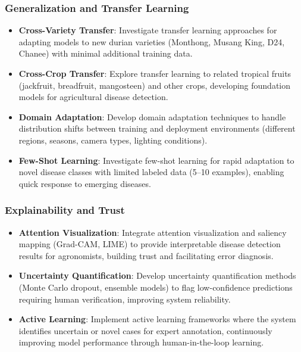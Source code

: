 \subsubsection{Generalization and Transfer Learning}

\begin{itemize}
\item \textbf{Cross-Variety Transfer}: Investigate transfer learning approaches for adapting models to new durian varieties (Monthong, Musang King, D24, Chanee) with minimal additional training data.

\item \textbf{Cross-Crop Transfer}: Explore transfer learning to related tropical fruits (jackfruit, breadfruit, mangosteen) and other crops, developing foundation models for agricultural disease detection.

\item \textbf{Domain Adaptation}: Develop domain adaptation techniques to handle distribution shifts between training and deployment environments (different regions, seasons, camera types, lighting conditions).

\item \textbf{Few-Shot Learning}: Investigate few-shot learning for rapid adaptation to novel disease classes with limited labeled data (5--10 examples), enabling quick response to emerging diseases.
\end{itemize}

\subsubsection{Explainability and Trust}

\begin{itemize}
\item \textbf{Attention Visualization}: Integrate attention visualization and saliency mapping (Grad-CAM, LIME) to provide interpretable disease detection results for agronomists, building trust and facilitating error diagnosis.

\item \textbf{Uncertainty Quantification}: Develop uncertainty quantification methods (Monte Carlo dropout, ensemble models) to flag low-confidence predictions requiring human verification, improving system reliability.

\item \textbf{Active Learning}: Implement active learning frameworks where the system identifies uncertain or novel cases for expert annotation, continuously improving model performance through human-in-the-loop learning.
\end{itemize}

